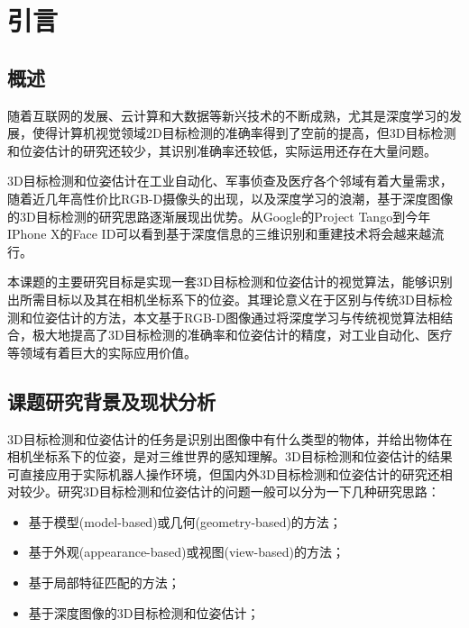 \chapter{引言}
\label{chap:introduction}
\section{概述}
随着互联网的发展、云计算和大数据等新兴技术的不断成熟，尤其是深度学习的发展，使得计算机视觉领域2D目标检测的准确率得到了空前的提高，但3D目标检测和位姿估计的研究还较少，其识别准确率还较低，实际运用还存在大量问题。

3D目标检测和位姿估计在工业自动化、军事侦查及医疗各个邻域有着大量需求，随着近几年高性价比RGB-D摄像头的出现，以及深度学习的浪潮，基于深度图像的3D目标检测的研究思路逐渐展现出优势。从Google的Project Tango到今年IPhone X的Face ID可以看到基于深度信息的三维识别和重建技术将会越来越流行。

本课题的主要研究目标是实现一套3D目标检测和位姿估计的视觉算法，能够识别出所需目标以及其在相机坐标系下的位姿。其理论意义在于区别与传统3D目标检测和位姿估计的方法，本文基于RGB-D图像通过将深度学习与传统视觉算法相结合，极大地提高了3D目标检测的准确率和位姿估计的精度，对工业自动化、医疗等领域有着巨大的实际应用价值。

\section{课题研究背景及现状分析}
3D目标检测和位姿估计的任务是识别出图像中有什么类型的物体，并给出物体在相机坐标系下的位姿，是对三维世界的感知理解。3D目标检测和位姿估计的结果可直接应用于实际机器人操作环境，但国内外3D目标检测和位姿估计的研究还相对较少。研究3D目标检测和位姿估计的问题一般可以分为一下几种研究思路：
\begin{itemize}
\item 基于模型(model-based)或几何(geometry-based)的方法；
\item 基于外观(appearance-based)或视图(view-based)的方法；
\item 基于局部特征匹配的方法； 
\item 基于深度图像的3D目标检测和位姿估计；
\end{itemize}

